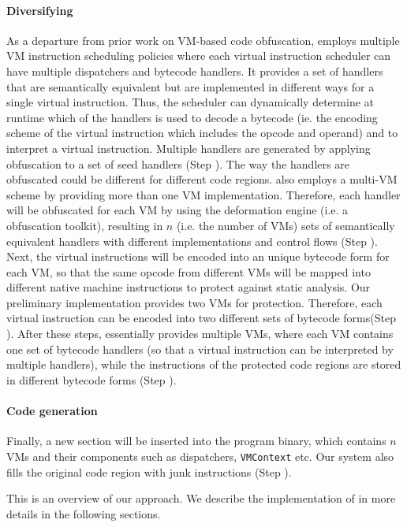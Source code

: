 \paragraph*{Diversifying}
As a departure from prior work on VM-based code obfuscation, \DSVMP employs multiple VM instruction scheduling policies
where each virtual instruction scheduler can have multiple dispatchers and bytecode handlers. It provides a set of handlers
that are semantically equivalent but  are implemented in different ways for a single virtual instruction.
Thus, the scheduler can dynamically determine at runtime which of the handlers is used to decode a bytecode (ie. the encoding
scheme of the virtual instruction which includes the opcode and operand) and to interpret a virtual instruction.
Multiple handlers are generated by applying obfuscation to a set of seed handlers (Step ).
The way the handlers are obfuscated could be different for different code regions.
\DSVMP also employs a multi-VM scheme by providing more than one VM implementation.
Therefore, each handler will be obfuscated for each VM by using the deformation engine (i.e. a obfuscation toolkit), resulting in $n$ (i.e. the number of VMs) sets of semantically equivalent handlers with different implementations and control flows (Step ).
Next, the virtual instructions will be encoded into an unique bytecode form for each VM, so that the same opcode from different
VMs will be mapped into different native machine instructions to protect against static analysis. 
Our preliminary implementation provides two VMs for protection. Therefore, each
virtual instruction can be encoded into two different sets of bytecode forms(Step ).
After these steps, \DSVMP essentially provides multiple VMs, where each VM contains one set of bytecode handlers (so that a virtual instruction
can be interpreted by multiple handlers), while the instructions of the protected code regions are stored in different bytecode forms (Step ).

\paragraph*{Code generation}
Finally, a new section will be inserted into the program binary, which contains $n$ VMs and their components such as dispatchers, \texttt{VMContext} etc. Our system also fills the original code region with junk instructions (Step ).

This is an overview of our approach. We describe the implementation of \DSVMP in more details in the following sections.
